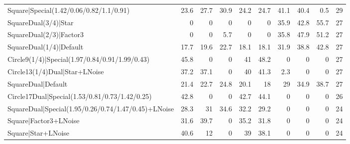 \begin{tabular}{lrrrrrrrrr}
 Square|Special(1.42/0.06/0.82/1.1/0.91)                  &           23.6 &           27.7 &            30.9 &           24.2 &           24.7 &            41.1 &            40.4 &             0.5 &           29 \\
 SquareDual(3/4)|Star                                     &            0   &            0   &             0   &            0   &            0   &            35.9 &            42.8 &            55.7 &           27 \\
 SquareDual(2/3)|Factor3                                  &            0   &            0   &             5.7 &            0   &            0   &            35.8 &            47.9 &            51.2 &           27 \\
 SquareDual(1/4)|Default                                  &           17.7 &           19.6 &            22.7 &           18.1 &           18.1 &            31.9 &            38.8 &            42.8 &           27 \\
 Circle9(1/4)|Special(1.97/0.84/0.91/1.99/0.43)           &           45.8 &            0   &             0   &           41   &           48.2 &             0   &             0   &             0   &           27 \\
 Circle13(1/4)Dual|Star+LNoise                            &           37.2 &           37.1 &             0   &           40   &           41.3 &             2.3 &             0   &             0   &           27 \\
 SquareDual|Default                                       &           21.4 &           22.7 &            24.8 &           20.1 &           18   &            29   &            34.9 &            38.7 &           27 \\
 Circle17Dual|Special(1.53/0.81/0.73/1.42/0.25)           &           42.8 &            0   &             0   &           42.7 &           44.1 &             0   &             0   &             0   &           26 \\
 SquareDual|Special(1.95/0.26/0.74/1.47/0.45)+LNoise      &           28.3 &           31   &            34.6 &           32.2 &           29.2 &             0   &             0   &             0   &           24 \\
 Square|Factor3+LNoise                                    &           31.6 &           39.7 &             0   &           35.2 &           31.8 &             0   &             0   &             0   &           24 \\
 Square|Star+LNoise                                       &           40.6 &           12   &             0   &           39   &           38.1 &             0   &             0   &             0   &           24 \\

\end{tabular}
